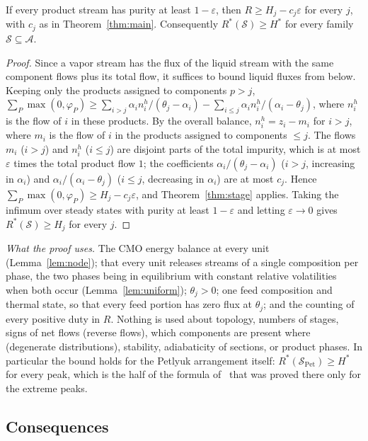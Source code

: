 \documentclass[11pt,a4paper]{report}
\newcommand{\cA}{\mathcal A}
\newcommand{\cS}{\mathcal S}
\newcommand{\Hs}{H^{*}}
\newcommand{\Spet}{\cS_{\mathrm{Pet}}}
\begin{document}
\begin{corollary}\label{cor:purity}
If every product stream has purity at least \(1-\varepsilon\), then \(R\ge H_j-c_j\varepsilon\) for every \(j\), with \(c_j\) as in
Theorem~\ref{thm:main}. Consequently \(R^*(\cS)\ge\Hs\) for every family \(\cS\subseteq\cA\).
\end{corollary}
\begin{proof}
Since a vapor stream has the flux of the liquid stream with the same component flows plus its total flow, it suffices to
bound liquid fluxes from below. Keeping only the products assigned to components \(p>j\),
\(\sum_P\max(0,\varphi_P)\ge\sum_{i>j}\alpha_in^h_i/(\theta_j-\alpha_i)-\sum_{i\le j}\alpha_in^h_i/(\alpha_i-\theta_j)\), where \(n^h_i\)
is the flow of \(i\) in these products. By the overall balance, \(n^h_i=z_i-m_i\) for \(i>j\), where \(m_i\) is the flow of \(i\)
in the products assigned to components \(\le j\). The flows \(m_i\) (\(i>j\)) and \(n^h_i\) (\(i\le j\)) are disjoint parts of the
total impurity, which is at most \(\varepsilon\) times the total product flow \(1\); the coefficients
\(\alpha_i/(\theta_j-\alpha_i)\) (\(i>j\), increasing in \(\alpha_i\)) and \(\alpha_i/(\alpha_i-\theta_j)\) (\(i\le j\), decreasing in
\(\alpha_i\)) are at most \(c_j\). Hence \(\sum_P\max(0,\varphi_P)\ge H_j-c_j\varepsilon\), and Theorem~\ref{thm:stage} applies.
Taking the infimum over steady states with purity at least \(1-\varepsilon\) and letting \(\varepsilon\to0\) gives
\(R^*(\cS)\ge H_j\) for every \(j\).
\end{proof}

\emph{What the proof uses.} The CMO energy balance at every unit (Lemma~\ref{lem:node}); that every unit releases
streams of a single composition per phase, the two phases being in equilibrium with constant relative volatilities when
both occur (Lemma~\ref{lem:uniform}); \(\theta_j>0\); one feed composition and thermal state, so that every feed portion has
zero flux at \(\theta_j\); and the counting of every positive duty in \(R\). Nothing is used about topology, numbers of
stages, signs of net flows (reverse flows), which components are present where (degenerate distributions), stability,
adiabaticity of sections, or product phases. In particular the bound holds for the Petlyuk arrangement itself:
\(R^*(\Spet)\ge\Hs\) for every peak, which is the half of the formula of~\autocite{HS3} that was proved there only for the
extreme peaks.

\subsection{Consequences}\label{sec:consequences}
\end{document}
